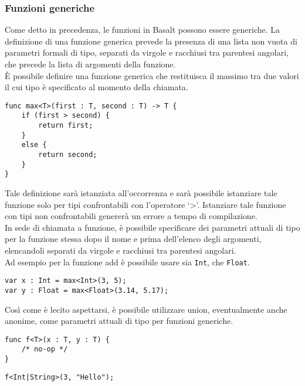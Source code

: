 \subsubsection{Funzioni generiche}
Come detto in precedenza, le funzioni in Basalt possono essere generiche. 
La definizione di una funzione generica prevede la presenza di una lista 
non vuota di parametri formali di tipo, separati da virgole e racchiusi tra 
parentesi angolari, che precede la lista di argomenti della funzione. \\

È possibile definire una funzione generica che restituisca il massimo tra due 
valori il cui tipo è specificato al momento della chiamata.

\vspace{0.5cm}
\begin{lstlisting}[frame=single]
func max<T>(first : T, second : T) -> T {
    if (first > second) {
        return first; 
    }
    else {
        return second;
    }
}
\end{lstlisting}
\vspace{0.5cm}


Tale definizione sarà istanziata all’occorrenza e sarà possibile 
istanziare tale funzione solo per tipi confrontabili con l’operatore ‘>’. 
Istanziare tale funzione con tipi non confrontabili genererà un errore a tempo 
di compilazione. \\

In sede di chiamata a funzione, è possibile specificare dei parametri attuali di 
tipo per la funzione stessa dopo il nome e prima dell’elenco degli argomenti, 
elencandoli separati da virgole e racchiusi tra parentesi angolari. \\

Ad esempio per la funzione add è possibile usare sia \texttt{Int}, che \texttt{Float}.

\vspace{0.5cm}
\begin{lstlisting}[frame=single]
var x : Int = max<Int>(3, 5);
var y : Float = max<Float>(3.14, 5.17);
\end{lstlisting}
\vspace{0.5cm}

Così come è lecito aspettarsi, è possibile utilizzare union, eventualmente anche anonime,
come parametri attuali di tipo per funzioni generiche. \\

\vspace{0.5cm}
\begin{lstlisting}[frame=single]
func f<T>(x : T, y : T) { 
    /* no-op */ 
}
\end{lstlisting}
\begin{lstlisting}[frame=single]
f<Int|String>(3, "Hello");
\end{lstlisting}
\vspace{0.5cm}